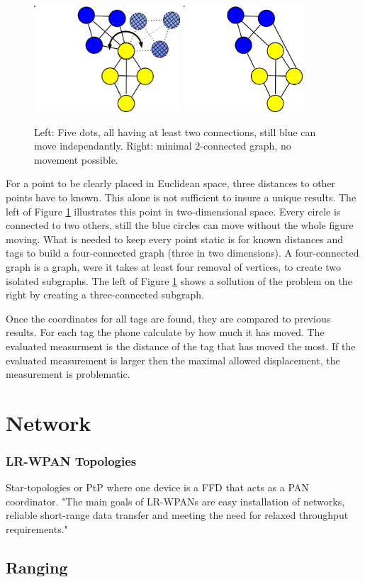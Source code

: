 \begin{figure}[ht!]
\includegraphics[height=150px]{graphics/schematics/connected_dots.png}
\includegraphics[height=150px]{graphics/schematics/connected_dots_k_connected.png}
 \caption{ Left: Five dots, all having at least two connections, still blue can move independantly. Right: minimal 2-connected graph, no movement possible. }
\label{f:connected_dots}
\end{figure}

For a point to be clearly placed in Euclidean space, three distances to other points have to known.
This alone is not sufficient to insure a unique results.
The left of Figure \ref{f:connected_dots} illustrates this point in two-dimensional space.
Every circle is connected to two others, still the blue circles can move without the whole figure moving.
What is needed to keep every point static is for known distances and tags to build a four-connected graph (three in two dimensions).
A four-connected graph is a graph, were it takes at least four removal of vertices, to create two isolated subgraphs.
The left of Figure \ref{f:connected_dots} shows a sollution of the problem on the right by creating a three-connected subgraph.

Once the coordinates for all tags are found, they are compared to previous results.
For each tag the phone calculate by how much it has moved.
The evaluated measurment is the distance of the tag that has moved the most.
If the evaluated measurement is larger then the maximal allowed displacement, the measurement is problematic.



\section{Network}
\label{s:network}

\subsubsection{LR-WPAN Topologies}
Star-topologies or PtP where one device is a FFD that acts as a PAN coordinator.
"The main goals of LR-WPANs are easy installation of networks, reliable short-range data transfer and meeting the need for relaxed throughput requirements."

\subsection{Ranging}